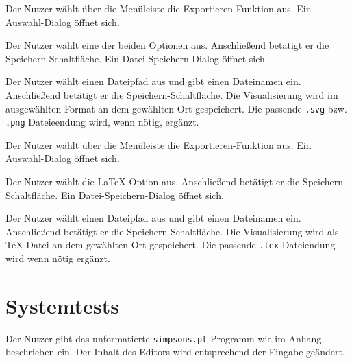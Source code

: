 \documentclass[parskip=full,11pt,twoside]{scrartcl}
\begin{document}

{Der Nutzer wählt über die Menüleiste die Exportieren-Funktion aus.}
{Ein Auswahl-Dialog öffnet sich.}

{Der Nutzer wählt eine der beiden Optionen aus. Anschließend betätigt er die Speichern-Schaltfläche.}
{Ein Datei-Speichern-Dialog öffnet sich.}

{Der Nutzer wählt einen Dateipfad aus und gibt einen Dateinamen ein. Anschließend betätigt er die Speichern-Schaltfläche.}
{Die Visualisierung wird im ausgewählten Format an dem gewählten Ort gespeichert. Die passende \texttt{.svg} bzw. \texttt{.png} Dateieendung wird, wenn nötig, ergänzt.}


{Der Nutzer wählt über die Menüleiste die Exportieren-Funktion aus.}
{Ein Auswahl-Dialog öffnet sich.}

{Der Nutzer wählt die LaTeX-Option aus. Anschließend betätigt er die Speichern-Schaltfläche.}
{Ein Datei-Speichern-Dialog öffnet sich.}

{Der Nutzer wählt einen Dateipfad aus und gibt einen Dateinamen ein. Anschließend betätigt er die Speichern-Schaltfläche.}
{Die Visualisierung wird als TeX-Datei an dem gewählten Ort gespeichert. Die passende \texttt{.tex} Dateiendung wird wenn nötig ergänzt.}

\section{Systemtests}


{Der Nutzer gibt das unformatierte \texttt{simpsons.pl}-Programm wie im Anhang beschrieben ein.}
{Der Inhalt des Editors wird entsprechend der Eingabe geändert.}
\end{document}
